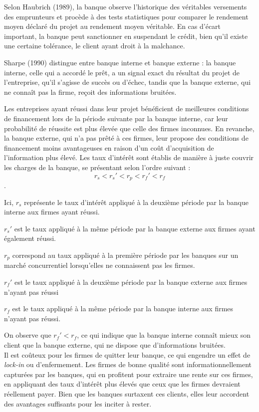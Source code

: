 \documentclass[a4paper, 12pt]{report}
\begin{document}
Selon Haubrich (1989), la banque observe l'historique des véritables versements des emprunteurs et procède à des tests statistiques pour comparer le rendement moyen déclaré du projet au rendement moyen véritable. En cas d'écart important, la banque peut sanctionner en suspendant le crédit, bien qu'il existe une certaine tolérance, le client ayant droit à la malchance. 

Sharpe (1990) distingue entre banque interne et banque externe : la banque interne, celle qui a accordé le prêt, a un signal exact du résultat du projet de l'entreprise, qu'il s'agisse de succès ou d'échec, tandis que la banque externe, qui ne connaît pas la firme, reçoit des informations bruitées. 

Les entreprises ayant réussi dans leur projet bénéficient de meilleures conditions de financement lors de la période suivante par la banque interne, car leur probabilité de réussite est plus élevée que celle des firmes inconnues. En revanche, la banque externe, qui n'a pas prêté à ces firmes, leur propose des conditions de financement moins avantageuses en raison d'un coût d'acquisition de l'information plus élevé.
\newpage
Les taux d'intérêt sont établis de manière à juste couvrir les charges de la banque, se présentant selon l'ordre suivant : 
\[ 
r_s < r_s' < r_p < r_f' < r_f 
\]. 

Ici, \( r_s \) représente le taux d'intérêt appliqué à la deuxième période par la banque interne aux firmes ayant réussi.

\( r_s' \) est le taux appliqué à la même période par la banque externe aux firmes ayant également réussi. 

\( r_p \) correspond au taux appliqué à la première période par les banques sur un marché concurrentiel lorsqu'elles ne connaissent pas les firmes. 

\( r_f' \) est le taux appliqué à la deuxième période par la banque externe aux firmes n'ayant pas réussi

\( r_f \) est le taux appliqué à la même période par la banque interne aux firmes n'ayant pas réussi. 

On observe que \( r_f' < r_f \), ce qui indique que la banque interne connaît mieux son client que la banque externe, qui ne dispose que d'informations bruitées.\\

Il est coûteux pour les firmes de quitter leur banque, ce qui engendre un effet de \textit{lock-in} ou d'enfermement. Les firmes de bonne qualité sont informationnellement capturées par les banques, qui en profitent pour extraire une rente sur ces firmes, en appliquant des taux d'intérêt plus élevés que ceux que les firmes devraient réellement payer. Bien que les banques surtaxent ces clients, elles leur accordent des avantages suffisants pour les inciter à rester. 
\end{document}
